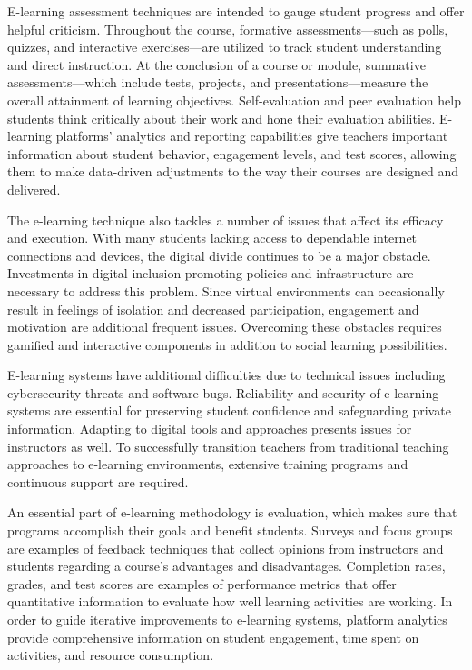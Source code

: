 \documentclass[BTech]{audiss}
\begin{document}
E-learning assessment techniques are intended to gauge student progress and offer helpful criticism. Throughout the course, formative assessments---such as polls, quizzes, and interactive exercises---are utilized to track student understanding and direct instruction. At the conclusion of a course or module, summative assessments---which include tests, projects, and presentations---measure the overall attainment of learning objectives. Self-evaluation and peer evaluation help students think critically about their work and hone their evaluation abilities. E-learning platforms' analytics and reporting capabilities give teachers important information about student behavior, engagement levels, and test scores, allowing them to make data-driven adjustments to the way their courses are designed and delivered.

The e-learning technique also tackles a number of issues that affect its efficacy and execution. With many students lacking access to dependable internet connections and devices, the digital divide continues to be a major obstacle. Investments in digital inclusion-promoting policies and infrastructure are necessary to address this problem. Since virtual environments can occasionally result in feelings of isolation and decreased participation, engagement and motivation are additional frequent issues. Overcoming these obstacles requires gamified and interactive components in addition to social learning possibilities.

E-learning systems have additional difficulties due to technical issues including cybersecurity threats and software bugs. Reliability and security of e-learning systems are essential for preserving student confidence and safeguarding private information. Adapting to digital tools and approaches presents issues for instructors as well. To successfully transition teachers from traditional teaching approaches to e-learning environments, extensive training programs and continuous support are required.

An essential part of e-learning methodology is evaluation, which makes sure that programs accomplish their goals and benefit students. Surveys and focus groups are examples of feedback techniques that collect opinions from instructors and students regarding a course's advantages and disadvantages. Completion rates, grades, and test scores are examples of performance metrics that offer quantitative information to evaluate how well learning activities are working. In order to guide iterative improvements to e-learning systems, platform analytics provide comprehensive information on student engagement, time spent on activities, and resource consumption.
\end{document}
